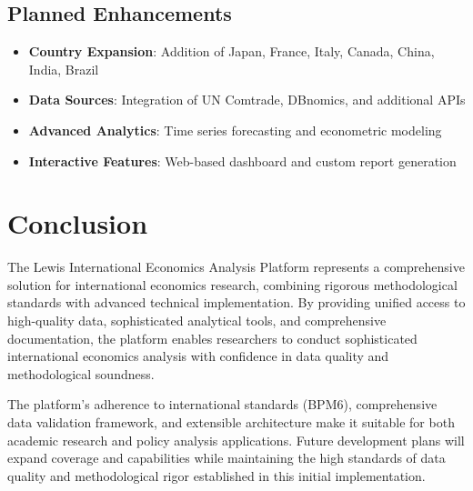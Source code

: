\documentclass[11pt,a4paper]{article}
\begin{document}
\subsection{Planned Enhancements}
\begin{itemize}
    \item \textbf{Country Expansion}: Addition of Japan, France, Italy, Canada, China, India, Brazil
    \item \textbf{Data Sources}: Integration of UN Comtrade, DBnomics, and additional APIs
    \item \textbf{Advanced Analytics}: Time series forecasting and econometric modeling
    \item \textbf{Interactive Features}: Web-based dashboard and custom report generation
\end{itemize}

\section{Conclusion}

The Lewis International Economics Analysis Platform represents a comprehensive solution for international economics research, combining rigorous methodological standards with advanced technical implementation. By providing unified access to high-quality data, sophisticated analytical tools, and comprehensive documentation, the platform enables researchers to conduct sophisticated international economics analysis with confidence in data quality and methodological soundness.

The platform's adherence to international standards (BPM6), comprehensive data validation framework, and extensible architecture make it suitable for both academic research and policy analysis applications. Future development plans will expand coverage and capabilities while maintaining the high standards of data quality and methodological rigor established in this initial implementation.
\end{document}
